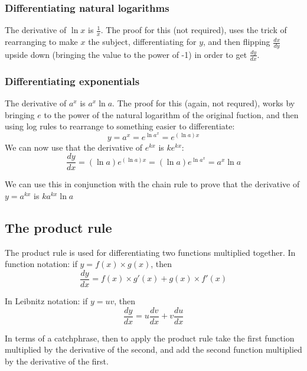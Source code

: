 \subsubsection{Differentiating natural logarithms}
The derivative of $\ln{x}$ is $\frac{1}{x}$. The proof for this (not required), uses the trick of rearranging to make $x$ the subject, differentiating for $y$, and then flipping $\frac{dx}{dy}$ upside down (bringing the value to the power of -1) in order to get $\frac{dy}{dx}$.

\subsubsection{Differentiating exponentials}
The derivative of $a^x$ is $a^x\ln{a}$. The proof for this (again, not requred), works by bringing $e$ to the power of the natural logarithm of the original fuction, and then using log rules to rearrange to something easier to differentiate:
\begin{equation}
	y = a^x = e^{\ln{a^x}} = e^{(\ln{a})x}
	\nonumber
\end{equation}
We can now use that the derivative of $e^{kx}$ is $ke^{kx}$:
\begin{equation}
	\frac{dy}{dx} = (\ln{a})e^{(\ln{a})x} = (\ln{a})e^{\ln{a^x}} = a^x\ln{a}
\end{equation}

We can use this in conjunction with the chain rule to prove that the derivative of $y=a^{kx}$ is $ka^{kx}\ln{a}$

\subsection{The product rule}
The product rule is used for differentiating two functions multiplied together. In function notation: if $y=f(x)\times g(x)$, then
\begin{equation}
	\frac{dy}{dx}=f(x)\times g'(x) + g(x)\times f'(x)
\end{equation}

In Leibnitz notation: if $y=uv$, then
\begin{equation}
	\frac{dy}{dx}=u\frac{dv}{dx}+v\frac{du}{dx}
\end{equation}

In terms of a catchphrase, then to apply the product rule take the first function multiplied by the derivative of the second, and add the second function multiplied by the derivative of the first.

